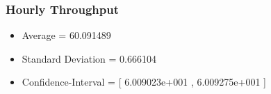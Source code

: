 \documentclass[aps,letterpaper,10pt]{revtex4}
\begin{document}
        \subsubsection{Hourly Throughput}
            \begin{itemize}
                \item Average = 60.091489
                \item Standard Deviation = 0.666104
                \item Confidence-Interval = [ 6.009023e+001 , 6.009275e+001 ]
            \end{itemize}
            \begin{figure}[htp]
                \begin{center}
                \end{center}
            \end{figure}



                
                

\end{document}
